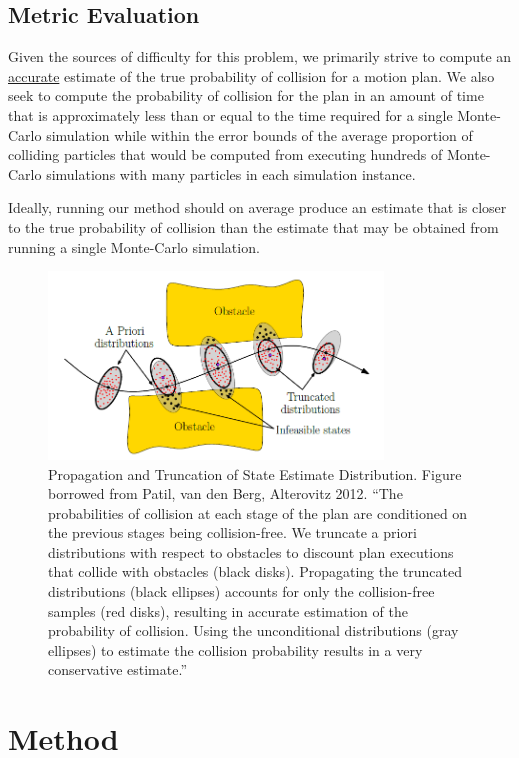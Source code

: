 \documentclass[journal]{IEEEtran}
\begin{document}

\subsection{Metric Evaluation}
Given the sources of difficulty for this problem, we primarily strive to compute an \underline{accurate} estimate of the true probability of collision for a motion plan. We also seek to compute the probability of collision for the plan in an amount of time that is approximately less than or equal to the time required for a single Monte-Carlo simulation while within the error bounds of the average proportion of colliding particles that would be computed from executing hundreds of Monte-Carlo simulations with many particles in each simulation instance.

Ideally, running our method should on average produce an estimate that is closer to the true probability of collision than the estimate that may be obtained from running a single Monte-Carlo simulation.

\begin{figure}[!t]
\centering
\includegraphics[width=3.5in]{motion_pic.PNG}
\caption{Propagation and Truncation of State Estimate Distribution. Figure borrowed from Patil, van den Berg, Alterovitz 2012. ``The probabilities of collision at each stage of the plan are conditioned on the previous stages being collision-free. We truncate a priori distributions with respect to obstacles to discount plan executions that collide with obstacles (black disks). Propagating the truncated distributions (black ellipses) accounts for only the collision-free samples (red disks), resulting in accurate estimation of the probability of collision. Using the unconditional distributions (gray ellipses) to estimate the collision probability results in a very conservative estimate.''\cite{IEEEhowto:patil}}
\label{patil_figure}
\end{figure}

\section{Method}
\end{document}
